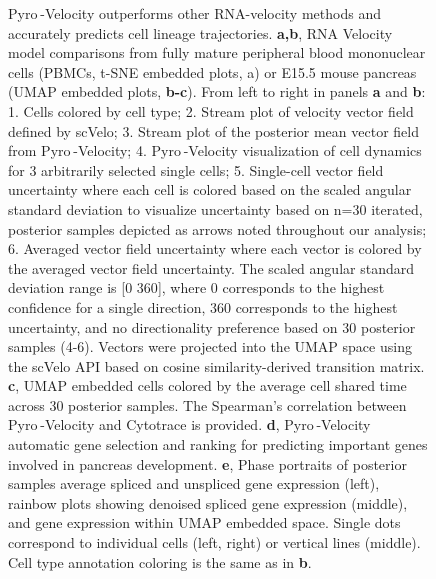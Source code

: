 \documentclass[
  sn-mathphys-num,
  lineno,
  twocolumn]{sn-jnl}
\begin{document}
\begin{figure}


\caption{\label{fig-model-results}Pyro -Velocity outperforms other
RNA-velocity methods and accurately predicts cell lineage trajectories.
\textbf{a,b}, RNA Velocity model comparisons from fully mature
peripheral blood mononuclear cells (PBMCs, t-SNE embedded plots, a) or
E15.5 mouse pancreas (UMAP embedded plots, \textbf{b-c}). From left to
right in panels \textbf{a} and \textbf{b}: 1. Cells colored by cell
type; 2. Stream plot of velocity vector field defined by scVelo; 3.
Stream plot of the posterior mean vector field from Pyro -Velocity; 4.
Pyro -Velocity visualization of cell dynamics for 3 arbitrarily selected
single cells; 5. Single-cell vector field uncertainty where each cell is
colored based on the scaled angular standard deviation to visualize
uncertainty based on n=30 iterated, posterior samples depicted as arrows
noted throughout our analysis; 6. Averaged vector field uncertainty
where each vector is colored by the averaged vector field uncertainty.
The scaled angular standard deviation range is {[}0 360{]}, where 0
corresponds to the highest confidence for a single direction, 360
corresponds to the highest uncertainty, and no directionality preference
based on 30 posterior samples (4-6). Vectors were projected into the
UMAP space using the scVelo API based on cosine similarity-derived
transition matrix. \textbf{c}, UMAP embedded cells colored by the
average cell shared time across 30 posterior samples. The Spearman's
correlation between Pyro -Velocity and Cytotrace is provided.
\textbf{d}, Pyro -Velocity automatic gene selection and ranking for
predicting important genes involved in pancreas development. \textbf{e},
Phase portraits of posterior samples average spliced and unspliced gene
expression (left), rainbow plots showing denoised spliced gene
expression (middle), and gene expression within UMAP embedded space.
Single dots correspond to individual cells (left, right) or vertical
lines (middle). Cell type annotation coloring is the same as in
\textbf{b}.}

\end{figure}%
\end{document}

